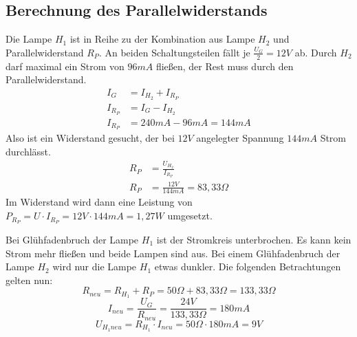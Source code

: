 \documentclass[
a4paper,     %
 headsepline, %
11pt         %
]{scrartcl}  %
\begin{document}
\subsection{Berechnung des Parallelwiderstands}
Die Lampe $H_1$ ist in Reihe zu der Kombination aus Lampe $H_2$ und Parallelwiderstand $R_P$. An beiden Schaltungsteilen fällt je $\frac{U_G}{2}=12V$ ab. Durch $H_2$ darf maximal ein Strom von $96mA$ fließen, der Rest muss durch den Parallelwiderstand.
\begin{align}
I_G &= I_{H_2} + I_{R_P} \nonumber \\
I_{R_P} &= I_G - I_{H_2}  \nonumber \\
I_{R_P} &= 240mA - 96mA = 144mA \nonumber
\end{align}
Also ist ein Widerstand gesucht, der bei $12V$ angelegter Spannung $144mA$ Strom durchlässt.
\begin{align}
R_P &= \frac{U_{H_2}}{I_{R_P}} \nonumber \\
R_P &= \frac{12V}{144mA} = 83,33 \Omega \nonumber 
\end{align}
Im Widerstand wird dann eine Leistung von $P_{R_P} = U \cdot I_{R_P} = 12V \cdot 144mA = 1,27W$ umgesetzt.

Bei Glühfadenbruch der Lampe $H_1$ ist der Stromkreis unterbrochen. Es kann kein Strom mehr fließen und beide Lampen sind aus.
Bei einem Glühfadenbruch der Lampe $H_2$ wird nur die Lampe $H_1$ etwas dunkler. Die folgenden Betrachtungen gelten nun:
\[R_{neu} = R_{H_1} + R_P = 50 \Omega + 83,33 \Omega = 133,33 \Omega \]
\[I_{neu} = \frac{U_G}{R_{neu}} = \frac{24V}{133,33 \Omega}=180mA \]
\[U_{H_{1}neu} = R_{H_1} \cdot I_{neu} = 50 \Omega \cdot 180mA = 9V \]



% 

% 
\end{document}
